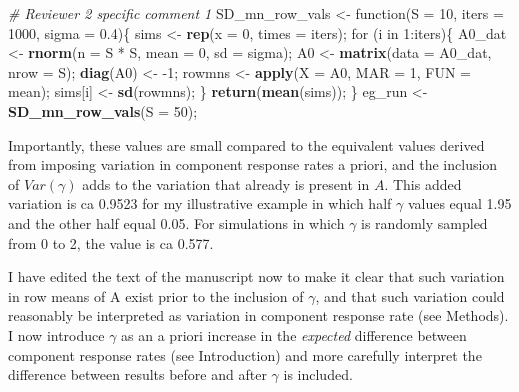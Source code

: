 \documentclass[]{article}
\newenvironment{Shaded}{\begin{snugshade}}{\end{snugshade}}
\newcommand{\KeywordTok}[1]{\textcolor[rgb]{0.13,0.29,0.53}{\textbf{{#1}}}}
\newcommand{\DataTypeTok}[1]{\textcolor[rgb]{0.13,0.29,0.53}{{#1}}}
\newcommand{\DecValTok}[1]{\textcolor[rgb]{0.00,0.00,0.81}{{#1}}}
\newcommand{\FloatTok}[1]{\textcolor[rgb]{0.00,0.00,0.81}{{#1}}}
\newcommand{\StringTok}[1]{\textcolor[rgb]{0.31,0.60,0.02}{{#1}}}
\newcommand{\CommentTok}[1]{\textcolor[rgb]{0.56,0.35,0.01}{\textit{{#1}}}}
\newcommand{\NormalTok}[1]{{#1}}
\begin{document}
\begin{Shaded}
\begin{Highlighting}[]
\CommentTok{# Reviewer 2 specific comment 1}
\NormalTok{SD_mn_row_vals <-}\StringTok{ }\NormalTok{function(}\DataTypeTok{S =} \DecValTok{10}\NormalTok{, }\DataTypeTok{iters =} \DecValTok{1000}\NormalTok{, }\DataTypeTok{sigma =} \FloatTok{0.4}\NormalTok{)\{}
    \NormalTok{sims  <-}\StringTok{ }\KeywordTok{rep}\NormalTok{(}\DataTypeTok{x =} \DecValTok{0}\NormalTok{, }\DataTypeTok{times =} \NormalTok{iters);}
    \NormalTok{for (i in }\DecValTok{1}\NormalTok{:iters)\{}
        \NormalTok{A0_dat   <-}\StringTok{ }\KeywordTok{rnorm}\NormalTok{(}\DataTypeTok{n =} \NormalTok{S *}\StringTok{ }\NormalTok{S, }\DataTypeTok{mean =} \DecValTok{0}\NormalTok{, }\DataTypeTok{sd =} \NormalTok{sigma);}
        \NormalTok{A0       <-}\StringTok{ }\KeywordTok{matrix}\NormalTok{(}\DataTypeTok{data =} \NormalTok{A0_dat, }\DataTypeTok{nrow =} \NormalTok{S); }
        \KeywordTok{diag}\NormalTok{(A0) <-}\StringTok{ }\NormalTok{-}\DecValTok{1}\NormalTok{;}
        \NormalTok{rowmns   <-}\StringTok{ }\KeywordTok{apply}\NormalTok{(}\DataTypeTok{X =} \NormalTok{A0, }\DataTypeTok{MAR =} \DecValTok{1}\NormalTok{, }\DataTypeTok{FUN =} \NormalTok{mean);}
        \NormalTok{sims[i]  <-}\StringTok{ }\KeywordTok{sd}\NormalTok{(rowmns);}
    \NormalTok{\}}
    \KeywordTok{return}\NormalTok{(}\KeywordTok{mean}\NormalTok{(sims));}
\NormalTok{\}}
\NormalTok{eg_run <-}\StringTok{ }\KeywordTok{SD_mn_row_vals}\NormalTok{(}\DataTypeTok{S =} \DecValTok{50}\NormalTok{);}
\end{Highlighting}
\end{Shaded}

Importantly, these values are small compared to the equivalent values
derived from imposing variation in component response rates a priori,
and the inclusion of \(Var(\gamma)\) adds to the variation that already
is present in \(A\). This added variation is ca 0.9523 for my
illustrative example in which half \(\gamma\) values equal 1.95 and the
other half equal 0.05. For simulations in which \(\gamma\) is randomly
sampled from 0 to 2, the value is ca 0.577.

I have edited the text of the manuscript now to make it clear that such
variation in row means of A exist prior to the inclusion of \(\gamma\),
and that such variation could reasonably be interpreted as variation in
component response rate (see Methods). I now introduce \(\gamma\) as an
a priori increase in the \emph{expected} difference between component
response rates (see Introduction) and more carefully interpret the
difference between results before and after \(\gamma\) is included.
\end{document}
